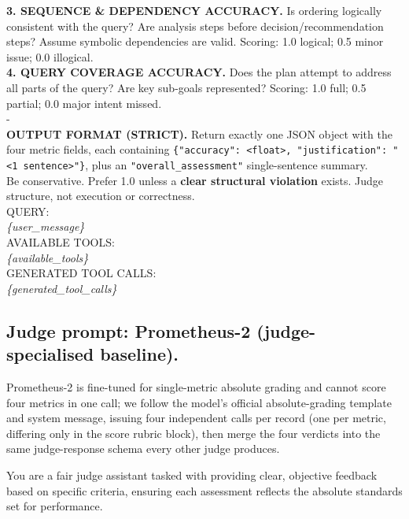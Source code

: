 \begin{promptbox}
\textbf{3. SEQUENCE \& DEPENDENCY ACCURACY.} Is ordering logically consistent with the query? Are analysis steps before decision/recommendation steps? Assume symbolic dependencies are valid. Scoring: 1.0 logical; 0.5 minor issue; 0.0 illogical.\\[3pt]
\textbf{4. QUERY COVERAGE ACCURACY.} Does the plan attempt to address all parts of the query? Are key sub-goals represented? Scoring: 1.0 full; 0.5 partial; 0.0 major intent missed.\\[4pt]
-\\
\textbf{OUTPUT FORMAT (STRICT).} Return exactly one JSON object with the four metric fields, each containing \texttt{\{"accuracy": <float>, "justification": "<1 sentence>"\}}, plus an \texttt{"overall\_assessment"} single-sentence summary.\\[4pt]
Be conservative. Prefer 1.0 unless a \textbf{clear structural violation} exists. Judge structure, not execution or correctness.\\[6pt]
QUERY:\\
\textit{\{user\_message\}}\\[4pt]
AVAILABLE TOOLS:\\
\textit{\{available\_tools\}}\\[4pt]
GENERATED TOOL CALLS:\\
\textit{\{generated\_tool\_calls\}}
\end{promptbox}

\subsection{Judge prompt: Prometheus-2 (judge-specialised baseline).}
\label{app:prompt-prometheus2}

Prometheus-2 \citep{kim2024prometheus2} is fine-tuned for single-metric absolute grading and cannot score four metrics in one call; we follow the model's official absolute-grading template and system message, issuing four independent calls per record (one per metric, differing only in the score rubric block), then merge the four verdicts into the same judge-response schema every other judge produces.

\begin{promptbox}
\ttfamily\small
You are a fair judge assistant tasked with providing clear, objective feedback based on specific criteria, ensuring each assessment reflects the absolute standards set for performance.
\end{promptbox}

